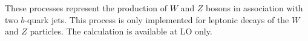 These processes represent the production of $W$ and $Z$
bosons in association with two $b$-quark jets.
This process is only implemented for leptonic decays of the
$W$ and $Z$ particles. The calculation is available at LO only.


